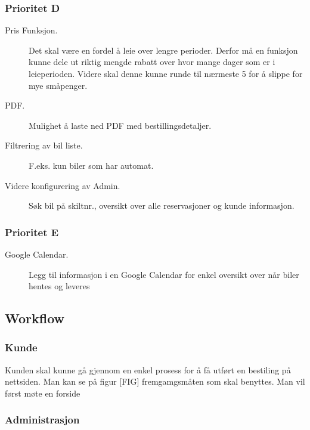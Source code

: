 \subsubsection*{Prioritet D}
\begin{description}
\item[Pris Funksjon.]Det skal være en fordel å leie over lengre perioder. Derfor må en funksjon kunne dele ut riktig mengde rabatt over hvor mange dager som er i leieperioden. Videre skal denne kunne runde til nærmeste 5 for å slippe for mye småpenger.
\item [PDF.] Mulighet å laste ned PDF med bestillingsdetaljer.
\item [Filtrering av bil liste.]F.eks. kun biler som har automat. 
\item [Videre konfigurering av Admin.]Søk bil på skiltnr., oversikt over alle reservasjoner og kunde informasjon.
\end{description}

\subsubsection*{Prioritet E}
\begin{description}
\item[Google Calendar.] Legg til informasjon i en Google Calendar for enkel oversikt over når biler hentes og leveres
\end{description}


\subsection{Workflow}
\subsubsection{Kunde}
Kunden skal kunne gå gjennom en enkel prosess for å få utført en bestiling på nettsiden. Man kan se på figur [FIG] fremgamgsmåten som skal benyttes. Man vil først møte en forside 
\subsubsection{Administrasjon}

\newpage
